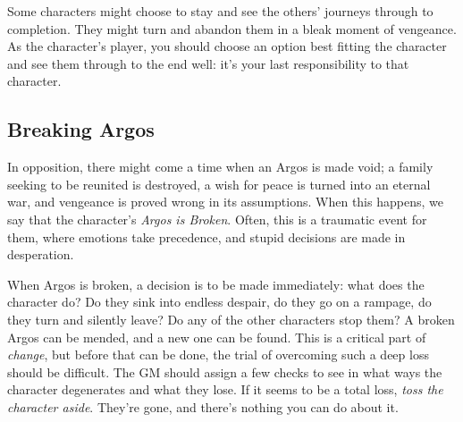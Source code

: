 \documentclass[../main.tex]{subfiles}
\begin{document}
        Some characters might choose to stay and see the others' journeys through to completion. They might turn and abandon them in a bleak moment of vengeance. As the character's player, you should choose an option best fitting the character and see them through to the end well: it's your last responsibility to that character.

    \subsection{Breaking Argos}

        In opposition, there might come a time when an Argos is made void; a family seeking to be reunited is destroyed, a wish for peace is turned into an eternal war, and vengeance is proved wrong in its assumptions. When this happens, we say that the character's \emph{Argos is Broken}. Often, this is a traumatic event for them, where emotions take precedence, and stupid decisions are made in desperation.

        When Argos is broken, a decision is to be made immediately: what does the character do? Do they sink into endless despair, do they go on a rampage, do they turn and silently leave? Do any of the other characters stop them? A broken Argos can be mended, and a new one can be found. This is a critical part of \emph{change}, but before that can be done, the trial of overcoming such a deep loss should be difficult. The GM should assign a few checks to see in what ways the character degenerates and what they lose. If it seems to be a total loss, \emph{toss the character aside}. They're gone, and there's nothing you can do about it.
\end{document}
